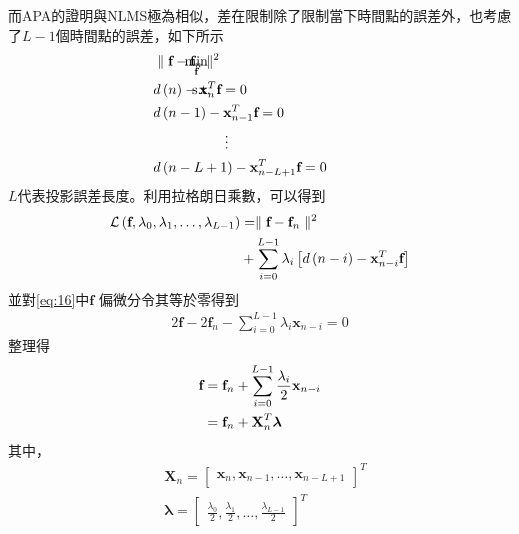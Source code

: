 \documentclass[conference]{IEEEtran}
\begin{document}
    而APA的證明與NLMS極為相似，差在限制除了限制當下時間點的誤差外，也考慮了$L-1$個時間點的誤差，如下所示
    \begin{align}
        & \hspace{-0.25cm} \min_{\textbf{f}} 
        & & \hspace{-1.8cm} \parallel \textbf{f}-\textbf{f}_n \parallel^2 \label{eq:14} \\ 
        & \text{s.t.} & & \hspace{-1.8cm} d \left( n \right)-\textbf{x}^T_n\textbf{f}=0 \notag \\
        &&& \hspace{-1.8cm} d \left( n-1 \right)-\textbf{x}^T_{n-1}\textbf{f}=0 \notag \\
        &&&  \vdots \notag \\
        &&& \hspace{-1.8cm} d \left( n-L+1 \right)-\textbf{x}^T_{n-L+1}\textbf{f}=0\label{eq:15}
    \end{align}
    $L$代表投影誤差長度。利用拉格朗日乘數，可以得到
    \begin{align}\label{eq:16}
        \mathcal{L}\left( \textbf{f}, \lambda_0,  \lambda_1, \ldots, \lambda_{L-1} \right)&=\parallel \textbf{f}-\textbf{f}_n \parallel^2\notag \\
        &+\sum \limits^{L-1}_{i=0}\lambda_i\left[ d\left( n-i \right)-\textbf{x}^T_{n-i}\textbf{f} \right]
    \end{align}
    並對\eqref{eq:16}中$\textbf{f}$ 偏微分令其等於零得到
    \begin{align}\label{eq:17}
        2\textbf{f}-2\textbf{f}_n-\sum \limits^{L-1}_{i=0}\lambda_i \textbf{x}_{n-i}=0 
    \end{align}
    整理得
    \begin{align}\label{eq:18}
        \textbf{f}&=\textbf{f}_n+\sum \limits^{L-1}_{i=0} \frac{\lambda_i}{2} \textbf{x}_{n-i} \notag \\
        &=\textbf{f}_n+\textbf{X}^T_n\boldsymbol{\lambda}
    \end{align}
    其中，
    \begin{align}
        &\textbf{X}_n=
        \begin{bmatrix}
            \textbf{x}_n, \textbf{x}_{n-1}, \ldots, \textbf{x}_{n-L+1}
        \end{bmatrix}^T\label{eq:19}\\
        &\boldsymbol{\lambda}=
        \begin{bmatrix}
            \frac{\lambda_0}{2}, \frac{\lambda_1}{2},\ldots, \frac{\lambda_{L-1}}{2}
        \end{bmatrix}^T\label{eq:20}
    \end{align}
\end{document}
